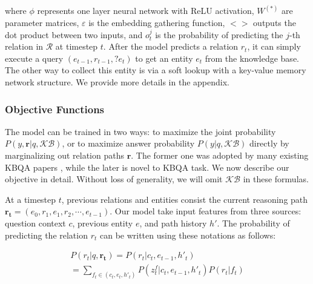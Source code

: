 where $\phi$ represents one layer neural network with ReLU activation, $W^{(*)}$ are parameter matrices, $\varepsilon$ is the embedding gathering function, $<>$ outputs the dot product between two inputs, and $o_t^j$ is the probability of predicting the $j$-th relation in $\mathcal{R}$ at timestep $t$. After the model predicts a relation $r_t$, it can simply execute a query $(e_{t-1}, r_{t-1}, ?e_t)$ to get an entity $e_t$ from the knowledge base. The other way to collect this entity is via a soft lookup with a key-value memory network structure. We provide more details in the appendix.


\subsubsection{Objective Functions}

The model can be trained in two ways: to maximize the joint probability $P(y,\mathbf{r}|q,\mathcal{KB})$, or to maximize answer probability $P(y|q,\mathcal{KB})$ directly by marginalizing out relation paths $\mathbf{r}$. The former one was adopted by many existing KBQA papers \cite{DBLP:conf/coling/ZhouHZ18}, while the later is novel to KBQA task. We now describe our objective in detail. Without loss of generality, we will omit $\mathcal{KB}$ in these formulas.

At a timestep $t$, previous relations and entities consist the current reasoning path $\mathbf{r_t} = (e_{0},r_{1},e_{1},r_{2}, \cdots,e_{t-1})$. Our model take input features from three sources: question context $c$, previous entity $e$, and path history $h'$. The probability of predicting the relation $r_t$ can be written using these notations as follows:


\begin{equation}
\begin{aligned}
P(r_t|q,\mathbf{r_t}) = P(r_t|c_t, e_{t-1}, h'_t) \\
       = \sum_{f_t \in (c_t,e_t,h'_t)}P(z_t^f|c_t,e_{t-1},h'_t)P(r_t|f_t)
\end{aligned}
\end{equation}



